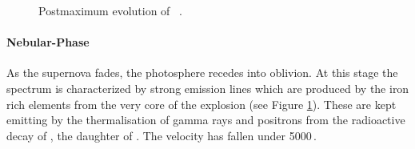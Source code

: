 \begin{figure}[htbp] %
   \centering
   \caption[Postmaximum evolution of SN 2003du]{Postmaximum evolution of \ \citep[Figures kindly provided by M. Tanaka;][]{2011MNRAS.410.1725T}.}
   \label{fig:sn2003du_postmax}
\end{figure}




\paragraph{Nebular-Phase}
As the supernova fades, the photosphere recedes into oblivion. At this stage the spectrum is characterized by strong emission lines which are produced by the iron rich elements from the very core of the explosion (see Figure \ref{fig:sn2003du_postmax}). These are kept emitting by the thermalisation of gamma rays and positrons from the radioactive decay of \Co, the daughter of \Ni. The velocity has fallen under 5000\,\kms. 




